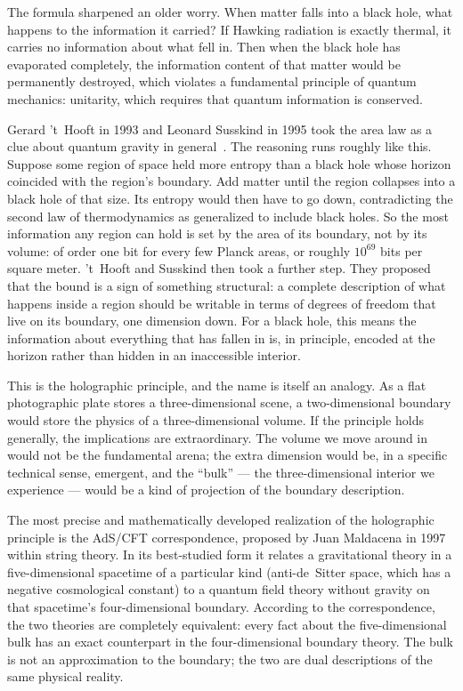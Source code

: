 The formula sharpened an older worry.
When matter falls into a black hole, what happens to the information it carried?
If Hawking radiation is exactly thermal, it carries no information about what fell in.
Then when the black hole has evaporated completely, the information content of that matter would be permanently destroyed, which violates a fundamental principle of quantum mechanics: unitarity, which requires that quantum information is conserved.

Gerard 't~Hooft in 1993 and Leonard Susskind in 1995 took the area law as a clue about quantum gravity in general~\citep{tHooft1993,Susskind1995}.
The reasoning runs roughly like this.
Suppose some region of space held more entropy than a black hole whose horizon coincided with the region's boundary.
Add matter until the region collapses into a black hole of that size.
Its entropy would then have to go down, contradicting the second law of thermodynamics as generalized to include black holes.
So the most information any region can hold is set by the area of its boundary, not by its volume: of order one bit for every few Planck areas, or roughly $10^{69}$ bits per square meter.
't~Hooft and Susskind then took a further step.
They proposed that the bound is a sign of something structural: a complete description of what happens inside a region should be writable in terms of degrees of freedom that live on its boundary, one dimension down.
For a black hole, this means the information about everything that has fallen in is, in principle, encoded at the horizon rather than hidden in an inaccessible interior.

This is the holographic principle, and the name is itself an analogy.
As a flat photographic plate stores a three-dimensional scene, a two-dimensional boundary would store the physics of a three-dimensional volume.
If the principle holds generally, the implications are extraordinary.
The volume we move around in would not be the fundamental arena; the extra dimension would be, in a specific technical sense, emergent, and the ``bulk'' --- the three-dimensional interior we experience --- would be a kind of projection of the boundary description.

The most precise and mathematically developed realization of the holographic principle is the AdS/CFT correspondence, proposed by Juan Maldacena in 1997 within string theory.
In its best-studied form it relates a gravitational theory in a five-dimensional spacetime of a particular kind (anti-de~Sitter space, which has a negative cosmological constant) to a quantum field theory without gravity on that spacetime's four-dimensional boundary.
According to the correspondence, the two theories are completely equivalent: every fact about the five-dimensional bulk has an exact counterpart in the four-dimensional boundary theory.
The bulk is not an approximation to the boundary; the two are dual descriptions of the same physical reality.

